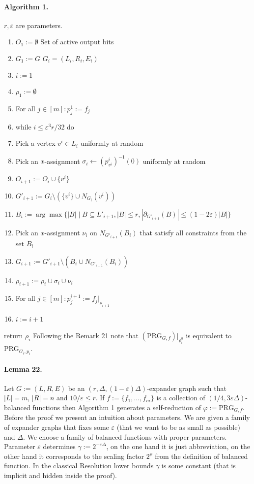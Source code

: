 \paragraph{Algorithm 1.} $r,\varepsilon$ are parameters.
\begin{enumerate}
\item $O_1:=\emptyset$ \hfill Set of active output bits
\item $G_1:=G$ \hfill $G_i=(L_i,R_i,E_i)$
\item $i:=1$
\item $\rho_1:=\emptyset$
\item For all $j\in[m]:p_j^1:=f_j$
\item while $i\leq\varepsilon^3r/32$ do
\item \quad Pick a vertex $v^i\in L_i$ uniformly at random
\item \quad Pick an $x$-assignment $\sigma_i\leftarrow(p_{v^i}^i)^{-1}(0)$ uniformly at random
\item \quad $O_{i+1}:=O_i\cup\{v^i\}$
\item \quad $G'_{i+1}:=G_i\setminus(\{v^i\}\cup N_{G_i}(v^i))$
\item \quad $B_i:=\arg\max\{|B|\mid B\subseteq L'_{i+1},|B|\leq r,|\partial_{G'_{i+1}}(B)|\leq(1-2\varepsilon)|B|\}$
\item \quad Pick an $x$-assignment $\nu_i$ on $N_{G'_{i+1}}(B_i)$ that satisfy all constraints from the set $B_i$
\item \quad $G_{i+1}:=G'_{i+1}\setminus(B_i\cup N_{G'_{i+1}}(B_i))$
\item \quad $\rho_{i+1}:=\rho_i\cup\sigma_i\cup\nu_i$
\item \quad For all $j\in[m]:p_j^{i+1}:=f_j|_{\rho_{i+1}}$
\item \quad $i:=i+1$
\end{enumerate}
return $\rho_i$
Following the Remark 21 note that $(\mathrm{PRG}_{G,f})|_{\rho_i^y}$ is equivalent to $\mathrm{PRG}_{G_i,p_i}$.
\paragraph{Lemma 22.} Let $G:=(L,R,E)$ be an $(r,\Delta,(1-\varepsilon)\Delta)$-expander graph such that $|L|=m$, $|R|=n$ and $10/\varepsilon\leq r$. If $f:=\{f_1,\ldots,f_m\}$ is a collection of $(1/4,3\varepsilon\Delta)$-balanced functions then Algorithm 1 generates a self-reduction of $\varphi:=\mathrm{PRG}_{G,f}$.
Before the proof we present an intuition about parameters. We are given a family of expander graphs that fixes some $\varepsilon$ (that we want to be as small as possible) and $\Delta$. We choose a family of balanced functions with proper parameters. Parameter $\varepsilon$ determines $\gamma:=2^{-\varepsilon\Delta}$, on the one hand it is just abbreviation, on the other hand it corresponds to the scaling factor $2^\rho$ from the definition of balanced function. In the classical Resolution lower bounds $\gamma$ is some constant (that is implicit and hidden inside the proof).
